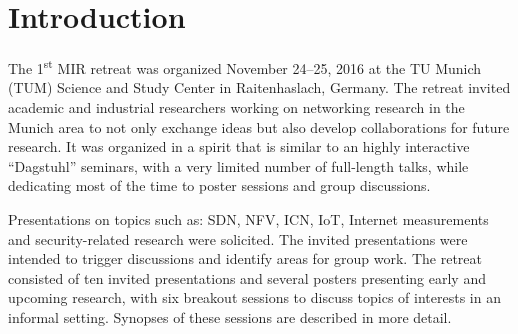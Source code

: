 \section{Introduction}\label{sec:introduction}


The 1\textsuperscript{st} \ac{MIR} retreat was organized November 24--25, 2016 at
the TU Munich (TUM) Science and Study Center in Raitenhaslach, Germany.  The retreat
invited academic and industrial researchers working on networking research in
the Munich area to not only exchange ideas but also develop collaborations
for future research.  It was organized in a spirit that is similar to an
highly interactive ``Dagstuhl'' seminars, with a very limited number of
full-length talks, while dedicating most of the time to poster sessions and
group discussions.

Presentations on topics such as: \ac{SDN}, \ac{NFV}, \ac{ICN}, \ac{IoT},
Internet measurements and security-related research were solicited. The
invited presentations were intended to trigger discussions and identify areas
for group work. The retreat consisted of ten invited presentations and several
posters presenting early and upcoming research, with six breakout sessions to
discuss topics of interests in an informal setting. Synopses of these
sessions are described in more detail.
